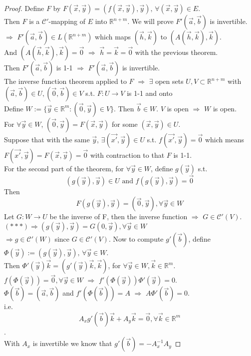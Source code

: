  \begin{proof}
    Define  $ F $ by  $ F(\vec{x},\vec{y})=(f(\vec{x},\vec{y}),\vec{y}),\,\forall (\vec{x},\vec{y})\in E $.\\
    Then  $ F $ is a  $ \mathscr{C}' $-mapping of  $ E $ into  $ \mathbb{R}^{n+m} $. We will prove  $ F'(\vec{a},\vec{b})$ is invertible.\\
     $ \Rightarrow  $  $ F'(\vec{a},\vec{b})\in L(\mathbb{R}^{n+m}) $ which maps  $ (\vec{h},\vec{k}) $ to  $ (A(\vec{h},\vec{k}),\vec{k}) $.\\
     And  $ (A(\vec{h},\vec{k}),\vec{k})=\vec{0} $  $ \Rightarrow $  $ \vec{h}=\vec{k}=\vec{0} $ with the previous theorem.\\
     Then  $ F'(\vec{a},\vec{b}) $ is  1-1  $ \Rightarrow $  $ F'(\vec{a},\vec{b}) $ is invertible.\\
     The inverse function theorem applied to  $ F  $  $ \Rightarrow  $  $ \exists $ open sets  $ U,V\subset\mathbb{R}^{n+m} $ with  $ (\vec{a},\vec{b})\in U, (\vec{0},\vec{b})\in V $ s.t. $ F:U\rightarrow V  $ is 1-1 and onto\\
     Define  $ W:=\{\vec{y}\in \mathbb{R}^m:(\vec{0},\vec{y})\in V\} $. Then  $ \vec{b}\in W  $. $ V $ is open  $ \Rightarrow $  $ W  $ is open.\\
     For  $ \forall \vec{y}\in W $,  $ (\vec{0},\vec{y})=F(\vec{x},\vec{y}) $ for some  $ (\vec{x},\vec{y})\in U $.\\
     Suppose that with the same  $ \vec{y} $,  $ \exists (\vec{x'},\vec{y})\in U  $ s.t.  $ f(\vec{x'},\vec{y})=\vec{0} $ which means  $ F(\vec{x'},\vec{y})=F(\vec{x},\vec{y})=\vec{0} $ with contraction to that $ F $ is 1-1.\\
     For the second part of the theorem, for  $ \forall \vec{y}\in W $, define  $ g(\vec{y}) $ s.t.  
     \[ (g(\vec{y}),\vec{y})\in U  \text{ and }  f(g(\vec{y}),\vec{y})=\vec{0} \tag{ $ \square\square $ }\]
     Then \[F(g(\vec{y}),\vec{y})=(\vec{0},\vec{y}),\forall \vec{y}\in W\tag{ $ \ast\ast\ast $ }\]
     Let  $ G:W\rightarrow U  $ be the inverse of F, then the inverse function  $ \Rightarrow  $  $ G\in \mathscr{C}'(V) $.\\
      $ (\ast\ast\ast)\Rightarrow(g(\vec{y}),\vec{y})=G(0,\vec{y}),\forall \vec{y}\in W $\\
       $ \Rightarrow g\in \mathscr{C}'(W) $ since  $ G\in \mathscr{C}'(V) $.
       Now to compute  $ g'(\vec{b}) $, define  $ \Phi(\vec{y}):=(g(\vec{y}),\vec{y}),\,\forall \vec{y}\in W $.\\
       Then  $ \Phi'(\vec{y})\vec{k}=(g'(\vec{y})\vec{k},\vec{k}) $, for  $ \forall \vec{y}\in W,\vec{k}\in \mathbb{R}^m $.\\
        $ f(\Phi(\vec{y}))=\vec{0},\forall \vec{y}\in W $ $ \Rightarrow  $  $ f'(\Phi(\vec{y}))\Phi'(\vec{y})=0 $.\\
         $ \Phi(\vec{b})=(\vec{a},\vec{b}) $ and  $ f'(\Phi(\vec{b}))=A $  $ \Rightarrow  $  $ A\Phi'(\vec{b})=0 $.\\
         i.e.  \[ A_x g'(\vec{b})\vec{k}+A_y\vec{k}=\vec{0},\forall \vec{k}\in \mathbb{R}^m\tag{ $ \triangle $ } \].\\
         With  $ A_x  $ is invertible we know that  $ g'(\vec{b})=-A_x^{-1}A_y $           
 \end{proof}
